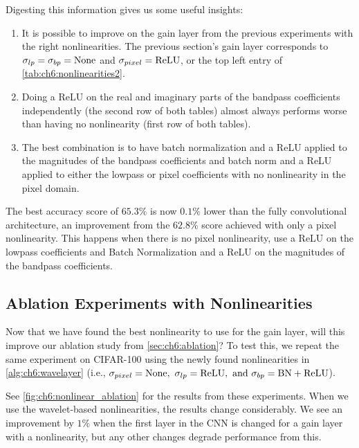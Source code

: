 Digesting this information gives us some useful insights: 
\begin{enumerate}
  \item It is possible to improve on the gain layer from the previous experiments
    with the right nonlinearities. The previous section's gain layer corresponds
    to $\sigma_{lp} = \sigma_{bp} = \mathrm{None}$ and $\sigma_{pixel} = \mathrm{ReLU}$, or
    the top left entry of \autoref{tab:ch6:nonlinearities2}.
  \item Doing a ReLU on the real and imaginary parts of the bandpass
    coefficients independently (the second row of both tables) almost always
    performs worse than having no nonlinearity (first row of both tables).
  \item The best combination is to have batch normalization and a ReLU applied
    to the magnitudes of the bandpass coefficients and batch norm and a ReLU
    applied to either the lowpass or pixel coefficients with no nonlinearity in
    the pixel domain.
\end{enumerate}

The best accuracy score of $65.3\%$ is now $0.1\%$ lower than the fully
convolutional architecture, an improvement from the $62.8\%$ score achieved with
only a pixel nonlinearity. This happens when there is no pixel nonlinearity, use
a ReLU on the lowpass coefficients and Batch Normalization and a ReLU on the
magnitudes of the bandpass coefficients.

\subsection{Ablation Experiments with Nonlinearities}
Now that we have found the best nonlinearity to use for the gain layer,
will this improve our ablation study from \autoref{sec:ch6:ablation}? To test this, 
we repeat the same experiment on CIFAR-100 using the newly found nonlinearities
in \autoref{alg:ch6:wavelayer} (i.e., $\sigma_{pixel} = \mathrm{None},\ \sigma_{lp} =
\mathrm{ReLU},\ \text{and } \sigma_{bp} = \mathrm{BN+ReLU}$).

See \autoref{fig:ch6:nonlinear_ablation} for the results from these experiments.
When we use the wavelet-based nonlinearities, the results change considerably. 
We see an improvement by $1\%$ when the first layer in the CNN is
changed for a gain layer with a nonlinearity, but any other changes degrade performance from this.

